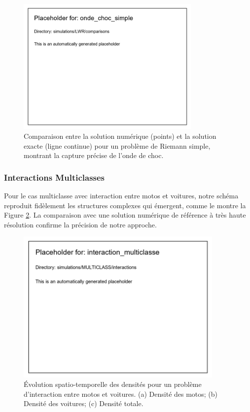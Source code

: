 \begin{figure}[htbp]
\centering
\includegraphics[width=0.8\textwidth]{simulations/LWR/comparisons/onde_choc_simple}
\caption{Comparaison entre la solution numérique (points) et la solution exacte (ligne continue) pour un problème de Riemann simple, montrant la capture précise de l'onde de choc.}
\label{fig:onde_choc_simple}
\end{figure}

\subsubsection{Interactions Multiclasses}
\label{subsubsec:interactions_multiclasses}

Pour le cas multiclasse avec interaction entre motos et voitures, notre schéma reproduit fidèlement les structures complexes qui émergent, comme le montre la Figure \ref{fig:interaction_multiclasse}. La comparaison avec une solution numérique de référence à très haute résolution confirme la précision de notre approche.

\begin{figure}[htbp]
\centering
\includegraphics[width=0.9\textwidth]{simulations/MULTICLASS/interactions/interaction_multiclasse}
\caption{Évolution spatio-temporelle des densités pour un problème d'interaction entre motos et voitures. (a) Densité des motos; (b) Densité des voitures; (c) Densité totale.}
\label{fig:interaction_multiclasse}
\end{figure}

